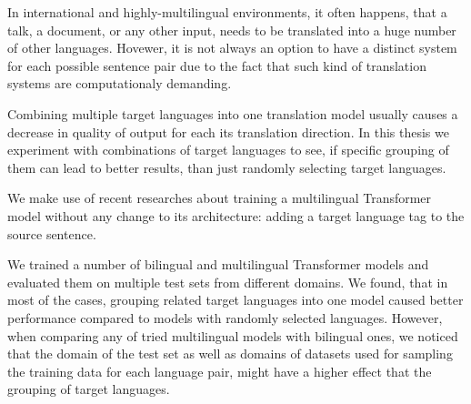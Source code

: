 \documentclass[12pt]{report}
\begin{document}

In international and highly-multilingual environments,
it often happens, that a talk, a document, or any other
input, needs to be translated into a huge number of other languages.
Hovewer, it is not always an option to have a distinct system for each
possible sentence pair due to the fact that such kind of translation
systems are computationaly demanding.

Combining multiple target languages into one translation model usually
causes a decrease in quality of output for each its translation
direction.
In this thesis we experiment with combinations of target languages
to see, if specific grouping of them can lead to better results,
than just randomly selecting target languages.

We make use of recent researches about training a multilingual
Transformer model without any change to its architecture:
adding a target language tag to the source sentence.

We trained a number of bilingual and multilingual
Transformer models and evaluated them on multiple test sets
from different domains.
We found, that in most of the cases, grouping related
target languages into one model caused better performance
compared to models with randomly selected languages.
However, when comparing any of tried multilingual models
with bilingual ones, we noticed that the domain of the test
set as well as domains of datasets used for sampling
the training data for each language pair, might have a higher
effect that the grouping of target languages.
\end{document}
